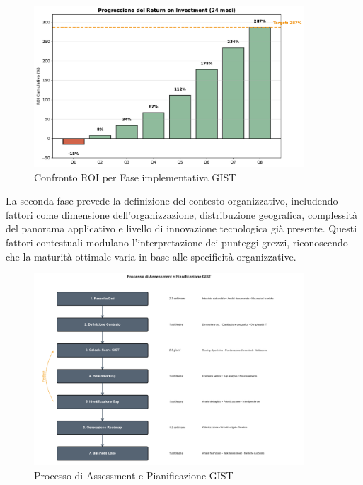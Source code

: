 \begin{figure}[htbp]
\centering
\includegraphics[width=0.9\textwidth]{thesis_figures/cap5/fig_5_2_roi_progression.pdf}

\caption{Confronto ROI per Fase implementativa GIST}
\label{fig:roi_gist}
\end{figure}


La seconda fase prevede la definizione del contesto organizzativo, includendo fattori come dimensione dell'organizzazione, distribuzione geografica, complessità del panorama applicativo e livello di innovazione tecnologica già presente. Questi fattori contestuali modulano l'interpretazione dei punteggi grezzi, riconoscendo che la maturità ottimale varia in base alle specificità organizzative.

\begin{figure}[htbp]
\centering
\includegraphics[width=0.9\textwidth]{thesis_figures/cap5/fig_5_2_process.pdf}
\caption{Processo di Assessment e Pianificazione GIST}
\label{fig:processo_gist}
\end{figure}

